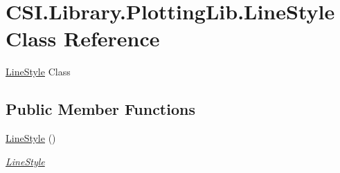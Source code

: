 \hypertarget{class_c_s_i_1_1_library_1_1_plotting_lib_1_1_line_style}{}\section{C\+S\+I.\+Library.\+Plotting\+Lib.\+Line\+Style Class Reference}
\label{class_c_s_i_1_1_library_1_1_plotting_lib_1_1_line_style}


\mbox{\hyperlink{class_c_s_i_1_1_library_1_1_plotting_lib_1_1_line_style}{Line\+Style}} Class  


\subsection*{Public Member Functions}
\begin{DoxyCompactItemize}
\item 
\mbox{\hyperlink{class_c_s_i_1_1_library_1_1_plotting_lib_1_1_line_style_a231d4fdddeff7d5b095600bfecc9100d}{Line\+Style}} ()
\begin{DoxyCompactList}\small\item\em \mbox{\hyperlink{class_c_s_i_1_1_library_1_1_plotting_lib_1_1_line_style}{Line\+Style}} \end{DoxyCompactList}\end{DoxyCompactItemize}
